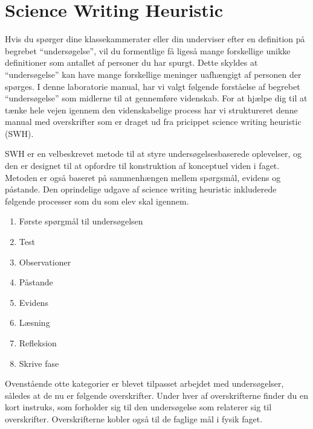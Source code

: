 
\chapter{Science Writing Heuristic}
 \label{app:A}
 
 Hvis du spørger dine klassekammerater eller din underviser efter en definition på begrebet ``undersøgelse'', vil du formentlige få ligeså mange forskellige unikke definitioner som antallet af personer du har spurgt. Dette skyldes at ``undersøgelse'' kan have mange forskellige meninger uafhængigt af personen der spørges. I denne laboratorie manual, har vi valgt følgende forståelse af begrebet ``undersøgelse'' som midlerne til at gennemføre videnskab. For at hjælpe dig til at tænke hele vejen igennem den videnskabelige process har vi struktureret denne manual med overskrifter som er draget ud fra pricippet science writing heuristic (SWH).
 
SWH er en velbeskrevet metode til at styre undersøgelsesbaserede oplevelser, og den er designet til at opfordre til konstruktion af konceptuel viden i faget. Metoden er også baseret på sammenhængen mellem spørgsmål, evidens og påstande. Den oprindelige udgave af science writing heuristic inkluderede følgende processer som du som elev skal igennem.
 
 \begin{enumerate}
 	\item Første spørgmål til undersøgelsen\vspace{-15pt}
 	\item Test\vspace{-15pt}
 	\item Observationer\vspace{-15pt}
 	\item Påstande\vspace{-15pt}
 	\item Evidens\vspace{-15pt}
 	\item Læsning\vspace{-15pt}
 	\item Refleksion\vspace{-15pt}
 	\item Skrive fase
\end{enumerate}

Ovenstående otte kategorier er blevet tilpasset arbejdet med undersøgelser, således at de nu er følgende overskrifter. Under hver af overskrifterne finder du en kort instruks, som forholder sig til den undersøgelse som relaterer sig til overskrifter. Overskrifterne kobler også til de faglige mål i fysik faget.

